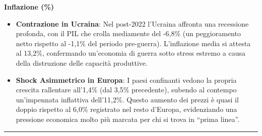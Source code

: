 \documentclass[
  letterpaper,
  DIV=11,
  numbers=noendperiod]{scrartcl}
\begin{document}
\centering \textbf{Inflazione (\%)}

\begin{table}
\centering\begingroup\fontsize{6}{8}\selectfont

\endgroup{}
\end{table}

\scriptsize

\begin{itemize}
\item
  \textbf{Contrazione in Ucraina}: Nel post-2022 l'Ucraina affronta una
  recessione profonda, con il PIL che crolla mediamente del -6,8\% (un
  peggioramento netto rispetto al -1,1\% del periodo pre-guerra).
  L'inflazione media si attesta al 13,2\%, confermando un'economia di
  guerra sotto stress estremo a causa della distruzione delle capacità
  produttive.
\item
  \textbf{Shock Asimmetrico in Europa}: I paesi confinanti vedono la
  propria crescita rallentare all'1,4\% (dal 3,5\% precedente), subendo
  al contempo un'impennata inflattiva dell'11,2\%. Questo aumento dei
  prezzi è quasi il doppio rispetto al 6,0\% registrato nel resto
  d'Europa, evidenziando una pressione economica molto più marcata per
  chi si trova in ``prima linea''.
\end{itemize}

\begin{center}\rule{0.5\linewidth}{0.5pt}\end{center}
\end{document}
